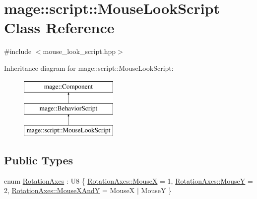 \hypertarget{classmage_1_1script_1_1_mouse_look_script}{}\section{mage\+:\+:script\+:\+:Mouse\+Look\+Script Class Reference}
\label{classmage_1_1script_1_1_mouse_look_script}


{\ttfamily \#include $<$mouse\+\_\+look\+\_\+script.\+hpp$>$}

Inheritance diagram for mage\+:\+:script\+:\+:Mouse\+Look\+Script\+:\begin{figure}[H]
\begin{center}
\leavevmode
\includegraphics[height=3.000000cm]{classmage_1_1script_1_1_mouse_look_script}
\end{center}
\end{figure}
\subsection*{Public Types}
\begin{DoxyCompactItemize}
\item 
enum \mbox{\hyperlink{classmage_1_1script_1_1_mouse_look_script_a662018db64c5dc84a958eb1c6123a829}{Rotation\+Axes}} \+: U8 \{ \mbox{\hyperlink{classmage_1_1script_1_1_mouse_look_script_a662018db64c5dc84a958eb1c6123a829abf27c48f8a38ed19eeeba089dd8d3ba1}{Rotation\+Axes\+::\+MouseX}} = 1, 
\mbox{\hyperlink{classmage_1_1script_1_1_mouse_look_script_a662018db64c5dc84a958eb1c6123a829a73843207a289db41b16a5bb8254ca425}{Rotation\+Axes\+::\+MouseY}} = 2, 
\mbox{\hyperlink{classmage_1_1script_1_1_mouse_look_script_a662018db64c5dc84a958eb1c6123a829a109431b32c091e8a7ad541546c66c522}{Rotation\+Axes\+::\+Mouse\+X\+AndY}} = MouseX $\vert$ MouseY
 \}
\end{DoxyCompactItemize}
